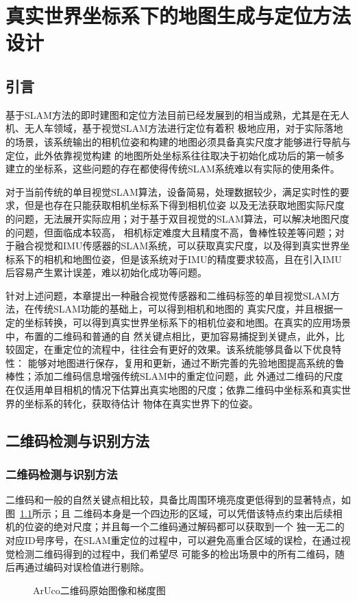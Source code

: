 \chapter{真实世界坐标系下的地图生成与定位方法设计}
\label{cha:chap2}
\section{引言}
\label{sec:2.1}
基于SLAM方法的即时建图和定位方法目前已经发展到的相当成熟，尤其是在无人机、无人车领域，基于视觉SLAM方法进行定位有着积
极地应用，对于实际落地的场景，该系统输出的相机位姿和构建的地图必须具备真实尺度才能够进行导航与定位，此外依靠视觉构建
的地图所处坐标系往往取决于初始化成功后的第一帧多建立的坐标系，这些问题的存在都使得传统SLAM系统难以有实际的使用条件。

对于当前传统的单目视觉SLAM算法，设备简易，处理数据较少，满足实时性的要求，但是也存在只能获取相机坐标系下得到相机位姿
以及无法获取地图实际尺度的问题，无法展开实际应用；对于基于双目视觉的SLAM算法，可以解决地图尺度的问题，但面临成本较高，
相机标定难度大且精度不高，鲁棒性较差等问题；对于融合视觉和IMU传感器的SLAM系统，可以获取真实尺度，以及得到真实世界坐
标系下的相机和地图位姿，但是该系统对于IMU的精度要求较高，且在引入IMU后容易产生累计误差，难以初始化成功等问题。

针对上述问题，本章提出一种融合视觉传感器和二维码标签的单目视觉SLAM方法，在传统SLAM功能的基础上，可以得到相机和地图的
真实尺度，并且根据一定的坐标转换，可以得到真实世界坐标系下的相机位姿和地图。在真实的应用场景中，布置的二维码和普通的自
然关键点相比，更加容易捕捉到关键点，此外，比较固定，在重定位的流程中，往往会有更好的效果。该系统能够具备以下优良特性：
能够对地图进行保存，复用和更新，通过不断完善的先验地图提高系统的鲁棒性；添加二维码信息增强传统SLAM中的重定位问题，此
外通过二维码的尺度在仅适用单目相机的情况下估算出真实地图的尺度；依靠二维码中坐标系和真实世界的坐标系的转化，获取待估计
物体在真实世界下的位姿。
\section{二维码检测与识别方法}
\label{sec:2.2}
\subsection{二维码检测与识别方法}
\label{sec:2.2.1}
二维码和一般的自然关键点相比较，具备比周围环境亮度更低得到的显著特点，如图~\ref{fig:Aruco_Aruco_Gradient}所示；且
二维码本身是一个四边形的区域，可以凭借该特点约束出后续相机的位姿的绝对尺度；并且每一个二维码通过解码都可以获取到一个
独一无二的对应ID号序号，在SLAM重定位的过程中，可以避免高重合区域的误检，在通过视觉检测二维码得到的过程中，我们希望尽
可能多的检出场景中的所有二维码，随后再通过编码对误检值进行剔除。
\begin{figure}[H]
  \centering%
  \hspace{6em}%
  \caption{ArUco二维码原始图像和梯度图}
  \label{fig:Aruco_Aruco_Gradient}
\end{figure}

